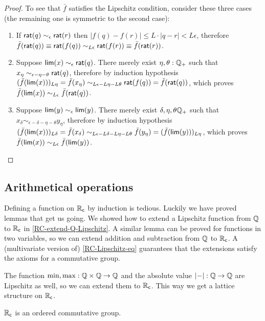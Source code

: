 \begin{proof}
  To see that $\bar{f}$ satisfies the Lipschitz condition, consider these three cases (the
  remaining one is symmetric to the second case):
  \begin{enumerate}
  \item If $\mathsf{rat}(q) \sim_\epsilon \mathsf{rat}(r)$ then $|f(q) - f(r)| \leq L \cdot |q - r| <
    L \epsilon$, therefore $\bar{f}(\mathsf{rat}(q)) \equiv \mathsf{rat}(f(q)) \sim_{L \epsilon}
    \mathsf{rat}(f(r)) \equiv \bar{f}(\mathsf{rat}(r))$.
  \item Suppose $\mathsf{lim}(x) \sim_\epsilon \mathsf{rat}(q)$. There merely exist $\eta, \theta :
    \mathbb{Q}_{+}$ such that $x_\eta \sim_{\epsilon - \eta - \theta} \mathsf{rat}(q)$, therefore by
    induction hypothesis $(\bar{f}(\mathsf{lim}(x)))_{L \eta} = \bar{f}(x_\eta) \sim_{L \epsilon - L
      \eta - L \theta} \mathsf{rat}(f(q)) = \bar{f}(\mathsf{rat}(q))$, which proves
    $\bar{f}(\mathsf{lim}(x)) \sim_{L \epsilon} \bar{f}(\mathsf{rat}(q))$.
  \item Suppose $\mathsf{lim}(y) \sim_\epsilon \mathsf{lim}(y)$. There merely exist $\delta, \eta,
    \theta \mathbb{Q}_{+}$ such that $x_\delta \sim_{\epsilon - \delta - \eta - \theta} y_\eta$,
    therefore by induction hypothesis $(\bar{f}(\mathsf{lim}(x)))_{L \delta} = \bar{f}(x_\delta)
    \sim_{L \epsilon - L \delta - L \eta - L \theta} \bar{f}(y_\eta) =
    (\bar{f}(\mathsf{lim}(y)))_{L \eta}$, which proves $\bar{f}(\mathsf{lim}(x)) \sim_{L \epsilon}
    \bar{f}(\mathsf{lim}(y))$. 
  \end{enumerate}
\end{proof}

\subsection{Arithmetical operations}
\label{sec:arithm-oper}

Defining a function on $\mathbb{R}_\mathsf{c}$ by induction is tedious. Luckily we have proved lemmas that
get us going. We showed how to extend a Lipschitz function from $\mathbb{Q}$ to $\mathbb{R}_\mathsf{c}$ in
\autoref{RC-extend-Q-Lipschitz}. A similar lemma can be proved for functions in two
variables, so we can extend addition and subtraction from $\mathbb{Q}$ to $\mathbb{R}_\mathsf{c}$. A (multivariate
version of) \autoref{RC-Lipschitz-eq} guarantees that the extensions satisfy the axioms
for a commutative group.

The function $\min, \max : \mathbb{Q} \times \mathbb{Q} \to \mathbb{Q}$ and the absolute value $|{-}| : \mathbb{Q} \to \mathbb{Q}$
are Lipschitz as well, so we can extend them to $\mathbb{R}_\mathsf{c}$. This way we get a lattice structure
on $\mathbb{R}_\mathsf{c}$.

\begin{thm}
  $\mathbb{R}_\mathsf{c}$ is an ordered commutative group.
\end{thm}

